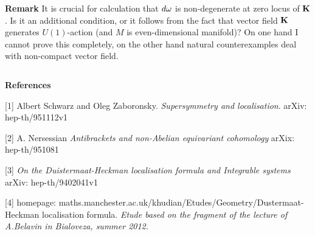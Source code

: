 {\bf Remark} It is crucial for calculation that $d{\omega}$ is non-degenerate
at zero locus of ${\bf K}$. Is it an additional condition, or it 
follows from the fact that vector field ${\bf K}$ generates $U(1)$-action
(and $M$ is even-dimensional manifold)?
 On one hand I cannot prove this completely, on the 
other hand natural counterexamples deal with non-compact vector field.


$$ $$

\centerline {\bf References}

 [1] Albert Schwarz and Oleg Zaboronsky. 
 {\it Supersymmetry and localisation}. arXiv: hep-th/951112v1

  \m

 [2]  A. Nersessian {\it Antibrackets and non-Abelian 
     equivariant cohomology}
   arXix: hep-th/951081

\m
        
 [3] {\it On the Duistermaat-Heckman localisation 
 formula and Integrable systems} 
arXiv: hep-th/9402041v1

\m


 [4] homepage: maths.manchester.ac.uk/khudian/Etudes/Geometry/Dustermaat-Heckman  localisation formula. 
{\it Etude based on the fragment of the lecture of 
A.Belavin in Bialoveza, summer 2012.} 

\bye
